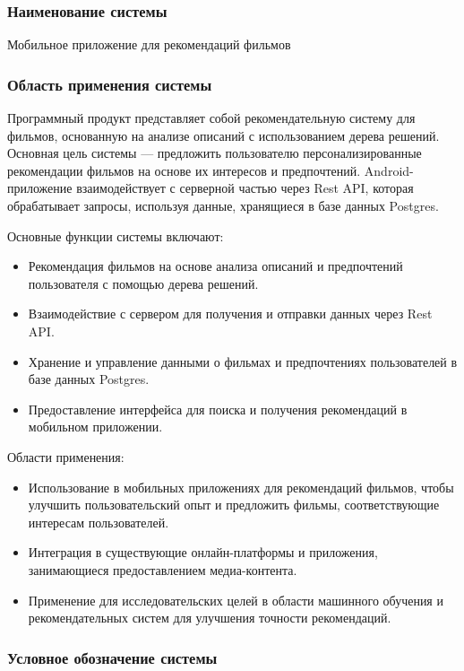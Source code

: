 \subsubsection{Наименование системы}

Мобильное приложение для рекомендаций фильмов

\subsubsection{Область применения системы}

Программный продукт представляет собой рекомендательную систему для фильмов, основанную на анализе описаний с использованием дерева решений. Основная цель системы — предложить пользователю персонализированные рекомендации фильмов на основе их интересов и предпочтений. Android-приложение взаимодействует с серверной частью через Rest API, которая обрабатывает запросы, используя данные, хранящиеся в базе данных Postgres.

Основные функции системы включают:

\begin{itemize}
	\item Рекомендация фильмов на основе анализа описаний и предпочтений пользователя с помощью дерева решений.
	\item Взаимодействие с сервером для получения и отправки данных через Rest API.
	\item Хранение и управление данными о фильмах и предпочтениях пользователей в базе данных Postgres.
	\item Предоставление интерфейса для поиска и получения рекомендаций в мобильном приложении.
\end{itemize}

Области применения:

\begin{itemize}
	\item Использование в мобильных приложениях для рекомендаций фильмов, чтобы улучшить пользовательский опыт и предложить фильмы, соответствующие интересам пользователей.
	\item Интеграция в существующие онлайн-платформы и приложения, занимающиеся предоставлением медиа-контента.
	\item Применение для исследовательских целей в области машинного обучения и рекомендательных систем для улучшения точности рекомендаций.
\end{itemize}

\subsubsection{Условное обозначение системы}

